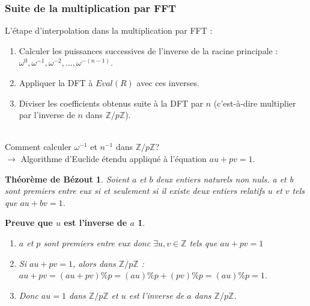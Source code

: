 \documentclass[8pt]{beamer}
\begin{document}
\newtheorem{Preuve1}{Preuve que $u$ est l'inverse de $a$}
\newtheorem{ThmBezout}{Théorème de Bézout}
\begin{frame}
\frametitle{Suite de la multiplication par FFT}
L'étape d'interpolation dans la multiplication par FFT :
\begin{enumerate}
    \item Calculer les puissances successives de l'inverse de la racine principale : \\
   $\omega^{0},\omega^{-1},\omega^{-2},\dots,\omega^{-(n-1)}$.
    \item Appliquer la DFT à $Eval(R)$ avec ces inverses.
    \item Diviser les coefficients obtenus suite à la DFT par $n$ (c'est-à-dire multiplier par l'inverse de $n$ dans $\mathbb{Z}/p\mathbb{Z}$).
\end{enumerate}
\ \\[0.2cm]
Comment calculer $\omega^{-1}$ et $n^{-1}$ dans $\mathbb{Z}/p\mathbb{Z}$? \\[0.1cm]
$\to$ Algorithme d'Euclide étendu appliqué à l'équation $au+pv=1$.

\begin{ThmBezout}
Soient $a$ et $b$ deux entiers naturels non nuls. a et b sont premiers entre eux si et seulement si il existe deux entiers relatifs $u$ et $v$ tels que $au + bv = 1$.
\end{ThmBezout}

\begin{Preuve1}
\begin{enumerate}
    \item $a$ et $p$ sont premiers entre eux donc $\exists u,v \in \mathbb{Z}$ tels que $au + pv = 1$
    \item Si $au+pv=1$, alors dans $\mathbb{Z}/p\mathbb{Z}$ : \newline
    $au+pv = (au+pv)\%p = (au)\%p + (pv)\%p = (au)\%p = 1$.
    \item Donc $au=1$ dans $\mathbb{Z}/p\mathbb{Z}$ et $u$ est l'inverse de $a$ dans $\mathbb{Z}/p\mathbb{Z}$.
\end{enumerate} 
\end{Preuve1}
\end{frame}
\end{document}
